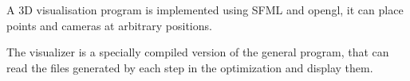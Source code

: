 A 3D visualisation program is implemented using SFML and opengl, it can place points
and cameras at arbitrary positions.

The visualizer is a specially compiled version of the general program, that can read the files generated
by each step in the optimization and display them.